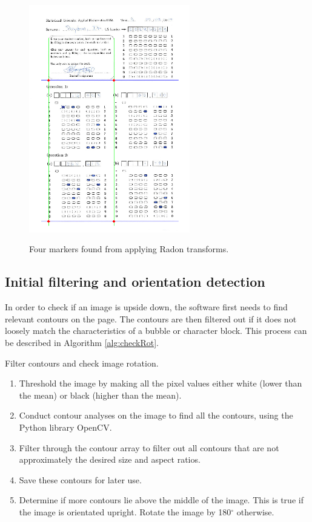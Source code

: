 \begin{figure}
  \centering
  \includegraphics[width=7cm]{RadonResults}\\
  \caption{Four markers found from applying Radon transforms.}
  \label{fig:radonResults}
\end{figure}

\subsection{Initial filtering and orientation detection}
\label{sec:InitImageFilter}

In order to check if an image is upside down, the software first needs to find relevant contours on the page. The contours are then filtered out if it does not loosely match the characteristics of a bubble or character block. This process can be described in Algorithm \ref{alg:checkRot}.

\begin{algorithm}[H]
\caption{Filter contours and check image rotation.}
\label{alg:checkRot}
\begin{enumerate}
\item Threshold the image by making all the pixel values either white (lower than the mean) or black (higher than the mean).
\item Conduct contour analyses on the image to find all the contours, using the Python library OpenCV.
\item Filter through the contour array to filter out all contours that are not approximately the desired size and aspect ratios.
\item Save these contours for later use.
\item Determine if more contours lie above the middle of the image. This is true if the image is orientated upright. Rotate the image by 180$^{\circ}$ otherwise.
\end{enumerate}
\end{algorithm}


